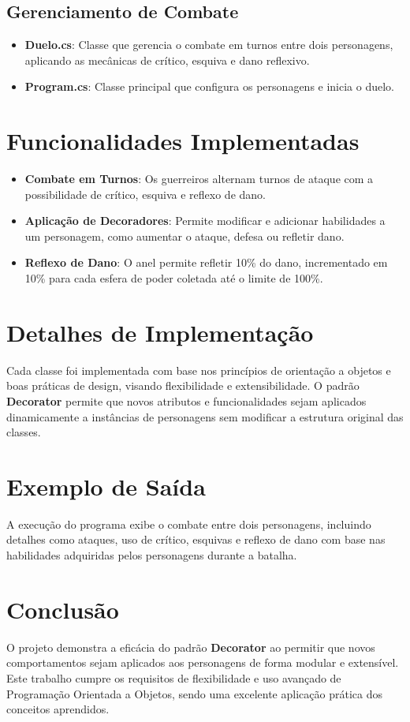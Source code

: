 \documentclass{article}
\begin{document}
\subsection*{Gerenciamento de Combate}
\begin{itemize}
    \item \textbf{Duelo.cs}: Classe que gerencia o combate em turnos entre dois personagens, aplicando as mecânicas de crítico, esquiva e dano reflexivo.
    \item \textbf{Program.cs}: Classe principal que configura os personagens e inicia o duelo.
\end{itemize}

\section*{Funcionalidades Implementadas}
\begin{itemize}
    \item \textbf{Combate em Turnos}: Os guerreiros alternam turnos de ataque com a possibilidade de crítico, esquiva e reflexo de dano.
    \item \textbf{Aplicação de Decoradores}: Permite modificar e adicionar habilidades a um personagem, como aumentar o ataque, defesa ou refletir dano.
    \item \textbf{Reflexo de Dano}: O anel permite refletir 10\% do dano, incrementado em 10\% para cada esfera de poder coletada até o limite de 100\%.
\end{itemize}

\section*{Detalhes de Implementação}
Cada classe foi implementada com base nos princípios de orientação a objetos e boas práticas de design, visando flexibilidade e extensibilidade. O padrão \textbf{Decorator} permite que novos atributos e funcionalidades sejam aplicados dinamicamente a instâncias de personagens sem modificar a estrutura original das classes.

\section*{Exemplo de Saída}
A execução do programa exibe o combate entre dois personagens, incluindo detalhes como ataques, uso de crítico, esquivas e reflexo de dano com base nas habilidades adquiridas pelos personagens durante a batalha.

\section*{Conclusão}
O projeto demonstra a eficácia do padrão \textbf{Decorator} ao permitir que novos comportamentos sejam aplicados aos personagens de forma modular e extensível. Este trabalho cumpre os requisitos de flexibilidade e uso avançado de Programação Orientada a Objetos, sendo uma excelente aplicação prática dos conceitos aprendidos.
\end{document}
